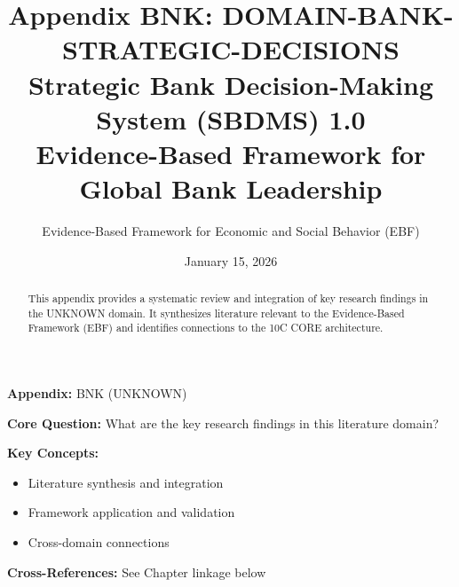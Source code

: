 \documentclass[11pt]{article}
\title{\textbf{Appendix BNK: DOMAIN-BANK-STRATEGIC-DECISIONS} \\ Strategic Bank Decision-Making System (SBDMS) 1.0 \\ Evidence-Based Framework for Global Bank Leadership}
\author{Evidence-Based Framework for Economic and Social Behavior (EBF)}
\date{January 15, 2026}
\begin{document}
\maketitle


\begin{tcolorbox}[colback=blue!5!white, colframe=blue!75!black,
    title=Quick Reference: Appendix BNK]
\textbf{Appendix:} BNK (UNKNOWN)

\textbf{Core Question:} What are the key research findings in this literature domain?

\textbf{Key Concepts:}
\begin{itemize}[nosep]
\item Literature synthesis and integration
\item Framework application and validation
\item Cross-domain connections
\end{itemize}

\textbf{Cross-References:} See Chapter linkage below
\end{tcolorbox}


\begin{abstract}
This appendix provides a systematic review and integration of key research findings
in the UNKNOWN domain. It synthesizes literature relevant to the Evidence-Based
Framework (EBF) and identifies connections to the 10C CORE architecture.
\end{abstract}
\end{document}
